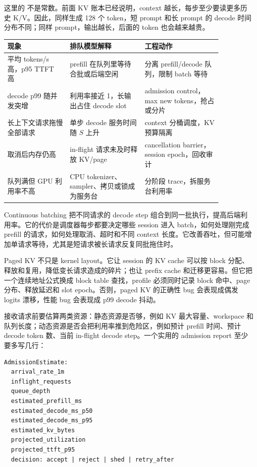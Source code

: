 这里的  不是常数。前面 KV 账本已经说明，context 越长，每步至少要读更多历史 K/V。因此，同样生成 128 个 token，短 prompt 和长 prompt 的 decode 时间分布不同；同样 prompt，输出越长，后面的 token 也会越来越贵。

\begin{center}
\small
\begin{tabular}{p{0.25\linewidth}p{0.30\linewidth}p{0.31\linewidth}}
\toprule
现象 & 排队模型解释 & 工程动作 \\
\midrule
平均 tokens/s 高，p95 TTFT 高 & prefill 在队列里等待合批或后端空闲 & 分离 prefill/decode 队列，限制 batch 等待 \\
decode p99 随并发突增 & 利用率接近 1，长输出占住 decode slot & admission control，max new tokens，抢占或分片 \\
长上下文请求拖慢全部请求 & 单步 decode 服务时间随 \(S\) 上升 & context 分桶调度，KV 预算隔离 \\
取消后内存仍高 & in-flight 请求未及时释放 KV/page & cancellation barrier，session epoch，回收审计 \\
队列满但 GPU 利用率不高 & CPU tokenizer、sampler、拷贝或锁成为服务台 & 分阶段 trace，拆服务台利用率 \\
\bottomrule
\end{tabular}
\end{center}

 Continuous batching 把不同请求的 decode step 组合到同一批执行，提高后端利用率。它的代价是调度器每步都要决定哪些 session 进入 batch，如何处理刚完成 prefill 的请求，如何处理取消、超时和不同 context 长度。它改善吞吐，但可能增加单请求等待，尤其是短请求被长请求反复同批拖住时。

 Paged KV 不只是 kernel layout。它让 session 的 KV cache 可以按 block 分配、释放和复用，降低变长请求造成的碎片；也让 prefix cache 和迁移更容易。但它把一个连续地址公式换成 block table 查找，profile 必须同时记录 block 命中、page 分布、释放延迟和 slot epoch。否则，paged KV 的正确性 bug 会表现成偶发 logits 漂移，性能 bug 会表现成 p99 decode 抖动。

 接收请求前要估算两类资源：静态资源是否够，例如 KV 最大容量、workspace 和队列长度；动态资源是否会把利用率推到危险区，例如预计 prefill 时间、预计 decode token 数、当前 in-flight decode step。一个实用的 admission report 至少要多写几行：

\begin{lstlisting}[numbers=none,caption={带排队模型的 admission report}]
AdmissionEstimate:
  arrival_rate_1m
  inflight_requests
  queue_depth
  estimated_prefill_ms
  estimated_decode_ms_p50
  estimated_decode_ms_p95
  estimated_kv_bytes
  projected_utilization
  projected_ttft_p95
  decision: accept | reject | shed | retry_after
\end{lstlisting}

